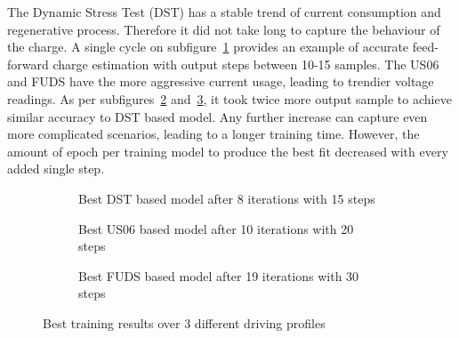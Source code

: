     The Dynamic Stress Test (DST) has a stable trend of current consumption and regenerative process.
    Therefore it did not take long to capture the behaviour of the charge.
    A single cycle on subfigure~\ref{subfig:res_DST} provides an example of accurate feed-forward charge estimation with output steps between 10-15 samples.
    The US06 and FUDS have the more aggressive current usage, leading to trendier voltage readings.
    As per subfigures~\ref{subfig:res_US} and~\ref{subfig:res_FUDS}, it took twice more output sample to achieve similar accuracy to DST based model. 
    Any further increase can capture even more complicated scenarios, leading to a longer training time.
    However, the amount of epoch per training model to produce the best fit decreased with every added single step.
    \begin{figure}[htbp]
        \centering
        \begin{subfigure}[b]{0.325\textwidth}
            \centering
            
            \caption{Best DST based model after 8 iterations with 15 steps}
            \label{subfig:res_DST}
        \end{subfigure}
        \hfill
        \begin{subfigure}[b]{0.325\textwidth}
            \centering
            
            \caption{Best US06 based model after 10 iterations with 20 steps}
            \label{subfig:res_US}
        \end{subfigure}
        \hfill
        \begin{subfigure}[b]{0.325\textwidth}
            \centering
            
            \caption{Best FUDS based model after 19 iterations with 30 steps}
            \label{subfig:res_FUDS}
        \end{subfigure}
        \caption{Best training results over 3 different driving profiles}
        \label{fig:Models_res}
    \end{figure}